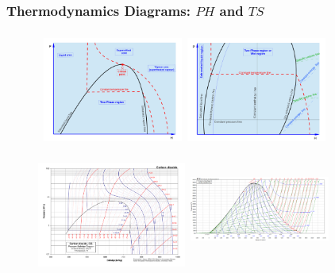 \documentclass[10pt,compress]{beamer}
\begin{document}
\begin{frame}
 \frametitle{Thermodynamics Diagrams: $PH$ and $TS$}
   \begin{figure}%
     \vbox{
      \hbox{\hspace{.8cm}
      \includegraphics[width=4.6cm,height=3.8cm,clip]{./Pics/Overview_Refrig18}
      \hspace{.1cm}
      \includegraphics[width=4.6cm,height=3.8cm,clip]{./Pics/Overview_Refrig17}}
      \vspace{-.1cm}
      \hbox{\hspace{.8cm}
      \includegraphics[width=4.9cm,height=4.cm,clip]{./Pics/CO2col}
      \hspace{.1cm}
      \includegraphics[width=4.6cm,height=3.87cm,clip]{./Pics/water_TS.png}}}
   \end{figure}
\end{frame}
\end{document}
